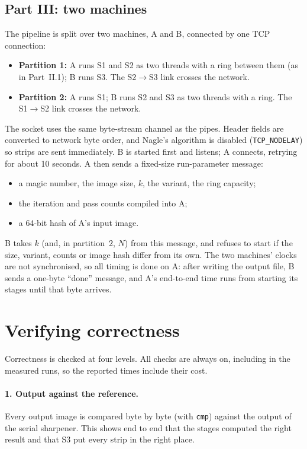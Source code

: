 \documentclass[11pt,a4paper]{article}
\newcommand{\code}[1]{\texttt{#1}}
\begin{document}
\subsection{Part III: two machines}
The pipeline is split over two machines, A and B, connected by one TCP connection:
\begin{itemize}
\item \textbf{Partition 1:} A runs S1 and S2 as two threads with a ring between them (as in
  Part~II.1); B runs S3. The S2$\to$S3 link crosses the network.
\item \textbf{Partition 2:} A runs S1; B runs S2 and S3 as two threads with a ring. The
  S1$\to$S2 link crosses the network.
\end{itemize}
The socket uses the same byte-stream channel as the pipes. Header fields are converted to network
byte order, and Nagle's algorithm is disabled (\code{TCP\_NODELAY}) so strips are sent
immediately. B is started first and listens; A connects, retrying for about 10 seconds. A then
sends a fixed-size run-parameter message:
\begin{itemize}
\item a magic number, the image size, $k$, the variant, the ring capacity;
\item the iteration and pass counts compiled into A;
\item a 64-bit hash of A's input image.
\end{itemize}
B takes $k$ (and, in partition~2, $N$) from this message, and refuses to start if the size, variant, counts or image
hash differ from its own. The two machines' clocks are not synchronised, so all timing is done
on A: after writing the output file, B sends a one-byte ``done'' message, and A's end-to-end
time runs from starting its stages until that byte arrives.

\section{Verifying correctness}
\label{sec:verification}
Correctness is checked at four levels. All checks are always on, including in the measured
runs, so the reported times include their cost.

\paragraph{1. Output against the reference.} Every output image is compared byte by byte (with
\code{cmp}) against the output of the serial sharpener. This shows end to end that the stages
computed the right result and that S3 put every strip in the right place.
\end{document}
